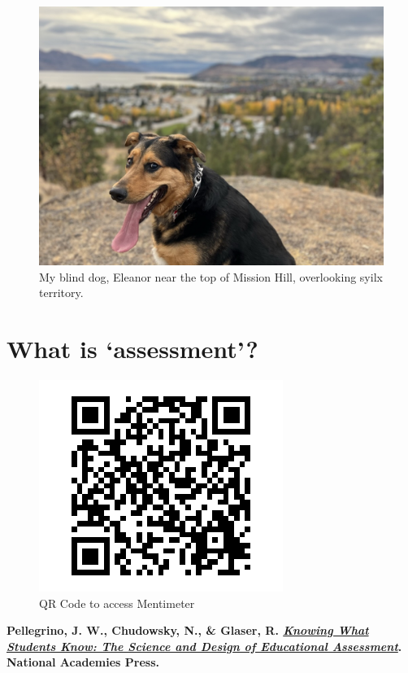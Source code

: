 \documentclass[
]{book}
\begin{document}
\begin{figure}
\centering
\includegraphics{assets/twu-asmt/ellie.jpeg}
\caption{My blind dog, Eleanor near the top of Mission Hill, overlooking syilx territory.}
\end{figure}

\hypertarget{what-is-assessment}{%
\section{What is `assessment'?}\label{what-is-assessment}}

\begin{figure}
\centering
\includegraphics{assets/twu-asmt/menti1.png}
\caption{QR Code to access Mentimeter}
\end{figure}

\textbf{Pellegrino, J. W., Chudowsky, N., \& Glaser, R. \href{https://doi.org/10.17226/10019}{\emph{Knowing What Students Know: The Science and Design of Educational Assessment}}. National Academies Press. }
\end{document}
